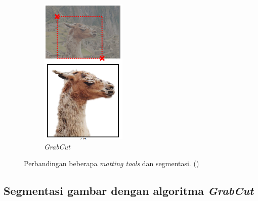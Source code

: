 \begin{figure}[H]
\begin{subfigure}{0.3\textwidth}
      \includegraphics[width=\textwidth]{gambar/gambar-2_5(f).png}
      \caption{\emph{GrabCut}}
    \end{subfigure}  
  \caption{
    Perbandingan beberapa \emph{matting tools} dan segmentasi. (\cite{Rother:2004})
    }
  \label{img:2.5}
\end{figure}


\subsection{{Segmentasi gambar dengan algoritma \emph{GrabCut}}}

